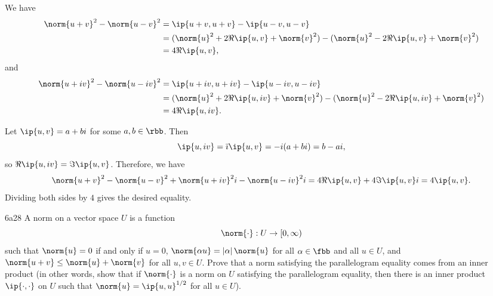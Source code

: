 \begin{sol}
    We have
    \begin{align*}
        \norm{u + v}^2 - \norm{u - v}^2 &= \ip{u + v, u + v} - \ip{u - v, u - v} \\
        &= (\norm{u}^2 + 2\Re\ip{u, v} + \norm{v}^2) - (\norm{u}^2 - 2\Re\ip{u, v} + \norm{v}^2) \\
        &= 4\Re\ip{u, v},
    \end{align*}
    and
    \begin{align*}
        \norm{u + iv}^2 - \norm{u - iv}^2 &= \ip{u + iv, u + iv} - \ip{u - iv, u - iv} \\
        &= (\norm{u}^2 + 2\Re\ip{u, iv} + \norm{v}^2) - (\norm{u}^2 - 2\Re\ip{u, iv} + \norm{v}^2) \\
        &= 4\Re\ip{u, iv}.
    \end{align*}

    Let $\ip{u, v} = a + bi$ for some $a, b \in \rbb$.
    Then
    \[
        \ip{u, iv} = \bar \imath\ip{u, v} = -i(a + bi) = b - ai,
    \]
    so $\Re\ip{u, iv} = \Im\ip{u, v}$.
    Therefore, we have
    \[
        \norm{u + v}^2 - \norm{u - v}^2 + \norm{u + iv}^2 i - \norm{u - iv}^2 i = 4\Re\ip{u, v} + 4\Im\ip{u, v}i = 4\ip{u, v}.
    \]
    Dividing both sides by $4$ gives the desired equality.
\end{sol}

\begin{exercise}{6a28}
    A norm on a vector space $U$ is a function
    \[
        \norm{\cdot} : U \to [0, \infty)
    \]
    such that $\norm{u} = 0$ if and only if $u = 0$, $\norm{\alpha u} = |\alpha|\,\norm{u}$ for all $\alpha \in \fbb$ and all $u \in U$, and $\norm{u + v} \leq \norm{u} + \norm{v}$ for all $u, v \in U$.
    Prove that a norm satisfying the parallelogram equality comes from an inner product (in other words, show that if $\norm{\cdot}$ is a norm on $U$ satisfying the parallelogram equality, then there is an inner product $\ip{\cdot, \cdot}$ on $U$ such that $\norm{u} = \ip{u, u}^{1/2}$ for all $u \in U$).

\end{exercise}

